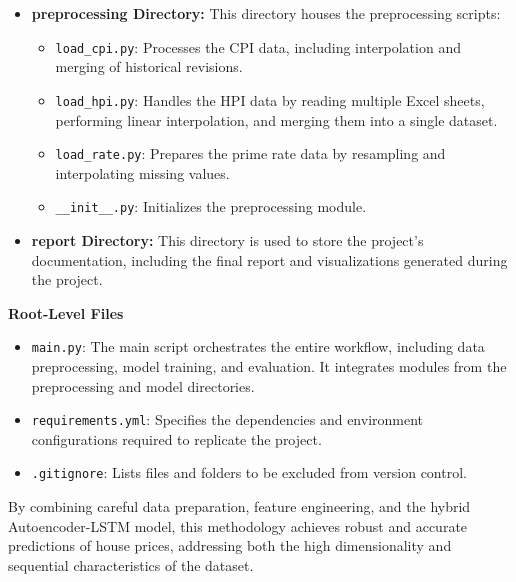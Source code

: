 \begin{itemize}
    \item \textbf{preprocessing Directory:} This directory houses the preprocessing scripts:
    \begin{itemize}
        \item \texttt{load\_cpi.py}: Processes the CPI data, including interpolation and merging of historical revisions.
        \item \texttt{load\_hpi.py}: Handles the HPI data by reading multiple Excel sheets, performing linear interpolation, and merging them into a single dataset.
        \item \texttt{load\_rate.py}: Prepares the prime rate data by resampling and interpolating missing values.
        \item \texttt{\_\_init\_\_.py}: Initializes the preprocessing module.
    \end{itemize}
    
    \item \textbf{report Directory:} This directory is used to store the project's documentation, including the final report and visualizations generated during the project.
\end{itemize}

\textbf{Root-Level Files}
\begin{itemize}
    \item \texttt{main.py}: The main script orchestrates the entire workflow, including data preprocessing, model training, and evaluation. It integrates modules from the preprocessing and model directories.
    \item \texttt{requirements.yml}: Specifies the dependencies and environment configurations required to replicate the project.
    \item \texttt{.gitignore}: Lists files and folders to be excluded from version control.
\end{itemize}

By combining careful data preparation, feature engineering, and the hybrid Autoencoder-LSTM model, this methodology achieves robust and accurate predictions of house prices, addressing both the high dimensionality and sequential characteristics of the dataset.